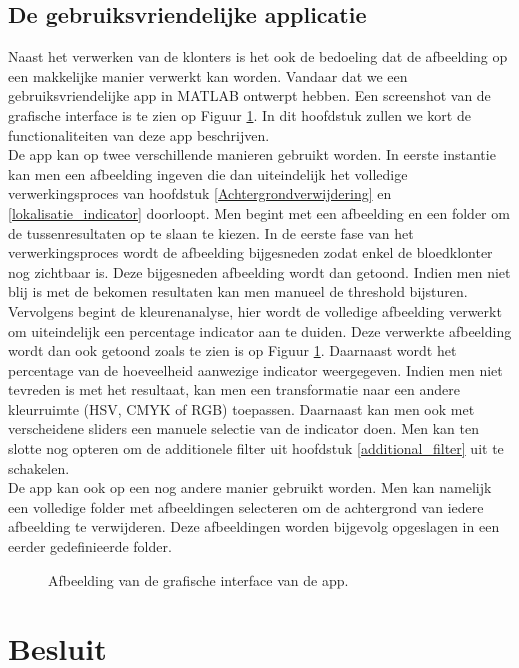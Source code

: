 \documentclass[a4paper,kulak]{kulakarticle}
\begin{document}
\subsection{De gebruiksvriendelijke applicatie}
Naast het verwerken van de klonters is het ook de bedoeling dat de afbeelding op een makkelijke manier verwerkt kan worden. Vandaar dat we een gebruiksvriendelijke app in MATLAB ontwerpt hebben.
Een screenshot van de grafische interface is te zien op Figuur \ref{figuur interface}. In dit hoofdstuk zullen we kort de functionaliteiten van deze app beschrijven.\\
De app kan op twee verschillende manieren gebruikt worden. In eerste instantie kan men een afbeelding ingeven die dan uiteindelijk het volledige verwerkingsproces van hoofdstuk \ref{Achtergrondverwijdering} en \ref{lokalisatie_indicator} doorloopt. Men begint met een afbeelding en een folder om de tussenresultaten op te slaan te kiezen. In de eerste fase van het verwerkingsproces wordt de afbeelding bijgesneden zodat enkel de bloedklonter nog zichtbaar is. Deze bijgesneden afbeelding wordt dan getoond. Indien men niet blij is met de bekomen resultaten kan men manueel de threshold bijsturen. Vervolgens begint de kleurenanalyse, hier wordt de volledige afbeelding verwerkt om uiteindelijk een percentage indicator aan te duiden. Deze verwerkte afbeelding wordt dan ook getoond zoals te zien is op Figuur \ref{figuur interface}. Daarnaast wordt het percentage van de hoeveelheid aanwezige indicator weergegeven. Indien men niet tevreden is met het resultaat, kan men een transformatie naar een andere kleurruimte (HSV, CMYK of RGB) toepassen. Daarnaast kan men ook met verscheidene sliders een manuele selectie van de indicator doen. Men kan ten slotte nog opteren om de additionele filter uit hoofdstuk \ref{additional_filter} uit te schakelen. \\
De app kan ook op een nog andere manier gebruikt worden. Men kan namelijk een volledige folder met afbeeldingen selecteren om de achtergrond van iedere afbeelding te verwijderen. Deze afbeeldingen worden bijgevolg opgeslagen in een eerder gedefinieerde folder.

\begin{figure}[H]
	\centering
	
	\caption{Afbeelding van de grafische interface van de app.}
	\label{figuur interface}
\end{figure}


\section*{Besluit}




\end{document}
